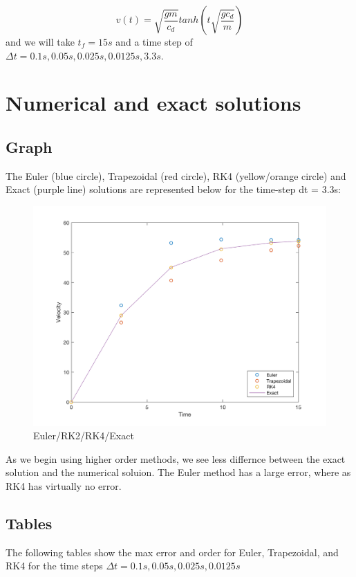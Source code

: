 \documentclass[12pt]{article}
\begin{document}
\begin{equation}
v(t)=\sqrt{\frac{gm}{c_d}}tanh(t\sqrt{\frac{gc_d}{m}})\nonumber
\end{equation}
and we will take $t_f = 15s$ and a time step of $\Delta t = 0.1s, 0.05s, 0.025s, 0.0125s, 3.3s.$

\section{Numerical and exact solutions  }\label{sec::Euler, RK2, RK4}


\subsection{Graph}\label{sec::Solutions}
The Euler (blue circle), Trapezoidal (red circle), RK4 (yellow/orange circle) and Exact (purple line) solutions are represented below for the time-step dt = 3.3s:
\begin{figure}[h]
\begin{center}
\includegraphics[width=1\textwidth]{Graph2}
\end{center}
\caption{Euler/RK2/RK4/Exact} \label{fig::MyFigure}
\end{figure}

As we begin using higher order methods, we see less differnce between the exact solution and the numerical soluion.  The Euler method has a large error, where as RK4 has virtually no error.
\subsection{Tables}
The following tables show the max error and order for Euler, Trapezoidal, and RK4 for the time steps $\Delta t = 0.1s, 0.05s, 0.025s, 0.0125s$
\end{document}
